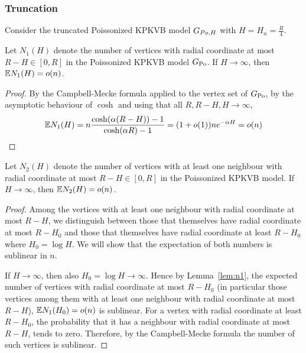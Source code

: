 \subsubsection{Truncation}
Consider the truncated Poissonized KPKVB model $G_{Po,H}$ with $H =H_n= \frac{R}{4}$.
\begin{lemma}\label{lem:n1}
Let $N_1(H)$ denote the number of vertices with radial coordinate at most $R-H \in [0,R]$ in the Poissonized KPKVB model $G_{\text{Po}}$. If $H \rightarrow \infty$, then $\mathbb{E} N_1(H) = o(n)$.
\end{lemma}
\begin{proof}
By the Campbell-Mecke formula applied to the vertex set of $G_{\text{Po}}$, by the asymptotic behaviour of $\cosh$ and using that all $R, R-H, H \rightarrow \infty$,
\begin{align*}
\mathbb{E} N_1(H) = n \frac{\cosh(\alpha(R-H))-1}{\cosh(\alpha R) -1} = (1+o(1)) n e^{-\alpha H} = o(n)
\end{align*}
\end{proof}
\begin{lemma}\label{lem:n2}
Let $N_2(H)$ denote the number of vertices with at least one neighbour with radial coordinate at most $R-H \in [0,R]$ in the Poissonized KPKVB model. If $H \rightarrow \infty$, then $\mathbb{E} N_2(H) = o(n)$.
\end{lemma}
\begin{proof}
Among the vertices with at least one neighbour with radial coordinate at most $R-H$, we distinguish between those that themselves have radial coordinate at most $R-H_0$ and those that themselves have radial coordinate at least $R-H_0$ where $H_0 = \log H$. We will show that the expectation of both numbers is sublinear in $n$.

If $H \rightarrow \infty$, then also $H_0 = \log H \rightarrow \infty$. Hence by Lemma~\ref{lem:n1}, the expected number of vertices with radial coordinate at most $R-H_0$ (in particular those vertices among them with at least one neighbour with radial coordinate at most $R-H$), $\mathbb{E} N_1(H_0) = o(n)$ is sublinear. For a vertex with radial coordinate at least $R-H_0$, the probability that it has a neighbour with radial coordinate at most $R-H$, tends to zero. Therefore, by the Campbell-Mecke formula the number of such vertices is sublinear.
\end{proof}

